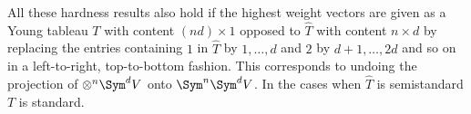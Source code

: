 \begin{remark}
    All these hardness results also hold if the highest weight vectors are given as a Young tableau $T$ with content $(nd) \times 1$ opposed to $\hat{T}$ with content $n \times d$ by replacing the entries containing $1$ in $\hat{T}$ by $1, \ldots, d$ and $2$ by $d+1, \ldots, 2d$ and so on in a left-to-right, top-to-bottom fashion.
    This corresponds to undoing the projection of $\otimes^n\Sym^d V$ onto $\Sym^n\Sym^d V$.
    In the cases when $\hat{T}$ is semistandard $T$ is standard.
\end{remark}



